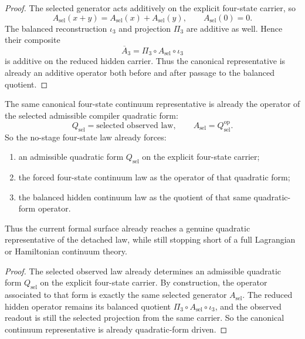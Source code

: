 \begin{proof}
The selected generator acts additively on the explicit four-state carrier, so
\[
A_{\mathrm{sel}}(x+y)=A_{\mathrm{sel}}(x)+A_{\mathrm{sel}}(y),
\qquad
A_{\mathrm{sel}}(0)=0.
\]
The balanced reconstruction \(\iota_3\) and projection \(\Pi_3\) are additive
as well. Hence their composite
\[
\overline A_3=\Pi_3\circ A_{\mathrm{sel}}\circ \iota_3
\]
is additive on the reduced hidden carrier. Thus the canonical representative is
already an additive operator both before and after passage to the balanced
quotient.
\end{proof}

\begin{theorem}
\label{thm:the-canonical-continuum-representative-is-already-quadratic-form-driven}
The same canonical four-state continuum representative is already the operator
of the selected admissible compiler quadratic form:
\[
Q_{\mathrm{sel}} = \text{selected observed law},\qquad
A_{\mathrm{sel}} = Q_{\mathrm{sel}}^{\mathrm{op}}.
\]
So the no-stage four-state law already forces:
\begin{enumerate}
\item an admissible quadratic form \(Q_{\mathrm{sel}}\) on the explicit
      four-state carrier;
\item the forced four-state continuum law as the operator of that quadratic
      form;
\item the balanced hidden continuum law as the quotient of that same
      quadratic-form operator.
\end{enumerate}
Thus the current formal surface already reaches a genuine quadratic
representative of the detached law, while still stopping short of a full
Lagrangian or Hamiltonian continuum theory.
\end{theorem}

\begin{proof}
The selected observed law already determines an admissible quadratic form
\(Q_{\mathrm{sel}}\) on the explicit four-state carrier. By construction, the
operator associated to that form is exactly the same selected generator
\(A_{\mathrm{sel}}\). The reduced hidden operator remains its balanced quotient
\(\Pi_3\circ A_{\mathrm{sel}}\circ \iota_3\), and the observed readout is still
the selected projection from the same carrier. So the canonical continuum
representative is already quadratic-form driven.
\end{proof}

